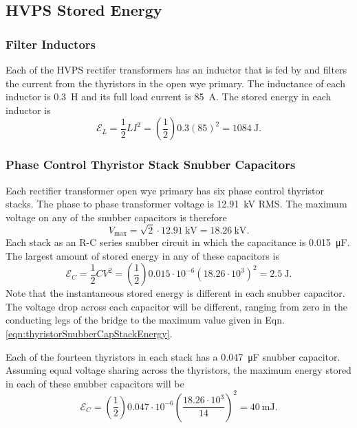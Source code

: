 \documentclass[letterpaper,11pt]{article}
\begin{document}
\subsection{HVPS Stored Energy}
\subsubsection{Filter Inductors}
Each of the HVPS rectifer transformers has an inductor that is fed by and filters the current from the thyristors in the open wye primary.  The inductance of each inductor is \SI{0.3}{\henry} and its full load current is \SI{85}{\ampere}.  The stored energy in each inductor is
\begin{equation}\label{eqn:inductorEnergy}
	\mathcal{E}_{L} = \dfrac{1}{2}LI^{2} = \left(\dfrac{1}{2}\right)0.3 \left(85\right)^{2} = \SI{1084}{\joule}.
\end{equation}
\subsubsection{Phase Control Thyristor Stack Snubber Capacitors}
Each rectifier transformer open wye primary has six phase control thyristor stacks.  The phase to phase transformer voltage is \SI{12.91}{\kV} RMS.  The maximum voltage on any of the snubber capacitors is therefore
\begin{equation}\label{eqn:thyristorSnubberCapVoltage}
	V_{\max} = \sqrt{2}\cdot \SI{12.91}{\kV} = \SI{18.26}{\kV}.
\end{equation}
Each stack as an R-C series snubber circuit in which the capacitance is \SI{0.015}{\micro\farad}.  The largest amount of stored energy in any of these capacitors is
\begin{equation}\label{eqn:thyristorSnubberCapStackEnergy}
	\mathcal{E}_{C}=\dfrac{1}{2}CV^{2}=\left(\dfrac{1}{2}\right)0.015\cdot 10^{-6} \left(18.26\cdot 10^{3}\right)^{2} = \SI{2.5}{\joule}.
\end{equation}
Note that the instantaneous stored energy is different in each snubber capacitor.  The voltage drop across each capacitor will be different, ranging from zero in the conducting legs of the bridge to the maximum value given in Eqn. \ref{eqn:thyristorSnubberCapStackEnergy}.

Each of the fourteen thyristors in each stack has a \SI{0.047}{\micro\farad} snubber capacitor.  Assuming equal voltage sharing across the thyristors, the maximum energy stored in each of these snubber capacitors will be
\begin{equation}\label{eqn:thyristorSnubberCapEnergy}
	\mathcal{E}_{C}=\left(\dfrac{1}{2}\right) 0.047\cdot 10^{-6} \left(\dfrac{18.26\cdot 10^{3}}{14}\right)^{2} = \SI{40}{\milli\joule}.
\end{equation}
\end{document}
